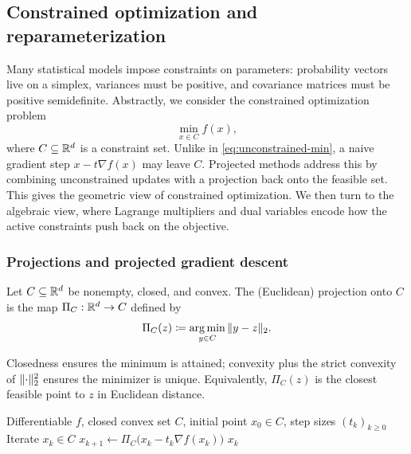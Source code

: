 \subsection{Constrained optimization and reparameterization}
\label{subsec:constrained-optimization}

Many statistical models impose constraints on parameters:
probability vectors live on a simplex, variances must be positive, and covariance matrices must be positive semidefinite.
Abstractly, we consider the constrained optimization problem
\begin{equation}
  \min_{x\in C} f(x),
  \label{eq:constrained-min}
\end{equation}
where $C\subseteq \mathbb{R}^d$ is a constraint set.
Unlike in \eqref{eq:unconstrained-min}, a naive gradient step $x-t\nabla f(x)$ may leave $C$.
Projected methods address this by combining unconstrained updates with a projection back onto the feasible set.
This gives the geometric view of constrained optimization.
We then turn to the algebraic view, where Lagrange multipliers and dual variables encode how the active constraints push back on the objective.

\subsubsection{Projections and projected gradient descent}
\label{subsubsec:projection}
\label{subsubsec:projected-gd}

\begin{definition}
Let $C\subseteq \mathbb{R}^d$ be nonempty, closed, and convex.
The (Euclidean) projection onto $C$ is the map $\Pi_C:\mathbb{R}^d\to C$ defined by
\[
  \Pi_C(z) \coloneqq \operatorname*{arg\,min}_{y\in C}\,\lVert y-z\rVert_2.
\]
\end{definition}

Closedness ensures the minimum is attained; convexity plus the strict convexity of $\lVert\cdot\rVert_2^2$ ensures the minimizer is unique.
Equivalently, $\Pi_C(z)$ is the closest feasible point to $z$ in Euclidean distance.

\begin{algorithm}
  \caption{Projected gradient descent}
  \label{alg:projected-gd}
  \begin{algorithmic}[1]
    \Require Differentiable $f$, closed convex set $C$, initial point $x_0\in C$, step sizes $(t_k)_{k\ge 0}$
    \Ensure Iterate $x_k \in C$
      \State $x_{k+1} \gets \Pi_C\bigl(x_k - t_k \nabla f(x_k)\bigr)$
    \EndFor
    \State \Return $x_k$
\end{algorithmic}
\end{algorithm}


